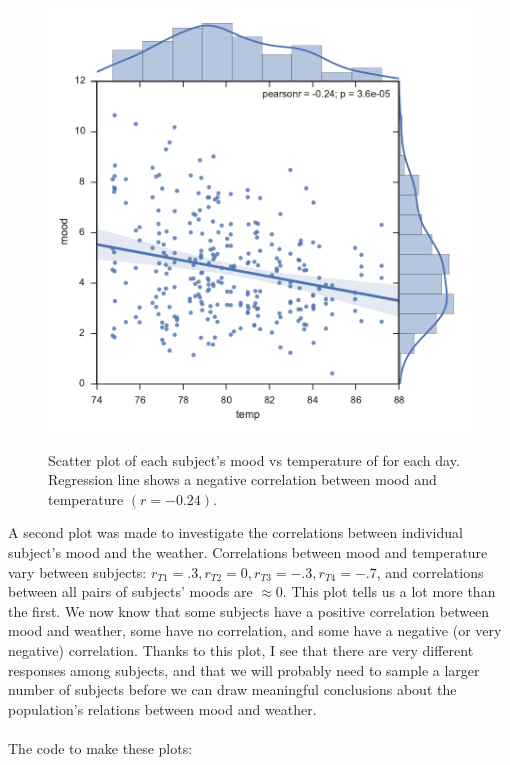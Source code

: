 \documentclass[onecolumn,10pt]{jhwhw}
\begin{document}
\begin{figure}[b!]
\begin{center}
\includegraphics[height=0.5\textheight]{p1-mean.pdf}
\label{fig:on}
\end{center}
\caption{Scatter plot of each subject's mood vs temperature of for each day. Regression line shows a negative correlation between mood and temperature $(r=-0.24)$. }
\end{figure}
A second plot was made to investigate the correlations between individual subject's mood and the weather. Correlations between mood and temperature vary between subjects: $r_{T1} = .3, r_{T2} = 0, r_{T3} = -.3, r_{T4} = -.7$, and correlations between all pairs of subjects' moods are $\approx 0$. This plot tells us a lot more than the first. We now know that some subjects have a positive correlation between mood and weather, some have no correlation, and some have a negative (or very negative) correlation. Thanks to this plot, I see that there are very different responses among subjects, and that we will probably need to sample a larger number of subjects before we can draw meaningful conclusions about the population's relations between mood and weather.\\
\\
The code to make these plots:
\end{document}
